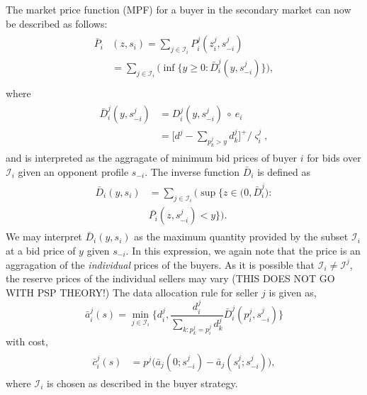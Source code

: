 \documentclass[12pt]{article}
\theoremstyle{definition}
\newcommand{\vs}{\varsigma}
\newcommand{\mcI}{\mathcal{I}}
\begin{document}
\begin{multicols}{2}
The market price function (MPF) for a buyer in the secondary market
can now be described as follows:
\begin{align}\label{dataprice}
\begin{split}
    \bar{P}_i&(z, s_i) =\displaystyle\sum_{j\in\mcI_i}P_i^j(z_i^j,
s_{-i}^j) \\
    &= \sum_{j\in\mcI_i}\bigg(\inf\bigg\lbrace y\ge 0 : 
    {\bar{D}_i^j}(y,s_{-i}^j)\bigg\rbrace \bigg),\\
\end{split}
\end{align}
where
\begin{align}
\begin{split}\label{datacomposed}
    \bar{D}_i^j(y,s_{-i}^j) &= D_i^j(y,s_{-i}^j)\ \circ\ e_i\\
    &= \bigg\lbrack d^j - \sum_{p_k^j> y} d_k^j\bigg\rbrack^+/\vs_i^j,
\end{split}
\end{align}
and is interpreted as the aggragate of minimum bid prices of buyer $i$ for bids
over $\mcI_i$ given an opponent profile $s_{-i}$.
The inverse function
$\bar{D}_i$ is defined as
\begin{align}\label{datapriceinverse}
\begin{split}
    \bar{D}_i(y, s_i) &= \displaystyle\sum_{j\in\mcI_i}\bigg(\sup\bigg\lbrace z\in \big( 0,
\bar{D}_i^j \big) : \\
    &\bar{P_i}(z,s_{-i}^j) < y\bigg\rbrace\bigg).
\end{split}
\end{align}
We may interpret $\bar{D}_i(y, s_i)$ as the maximum quantity provided by the subset
$\mcI_i$ at a bid price of $y$ given $s_{-i}$. In this expression, we again note that
the price is an aggragation of the \emph{individual} prices of the buyers. As it is
possible that $\mcI_i \ne \mcI^j$, the reserve prices of the individual sellers
may vary (THIS DOES NOT GO WITH PSP THEORY!)
The data allocation rule for seller $j$ is given as,
\begin{equation}\label{dataallocation}
    \bar{a}_i^j(s) = \min_{j\in\mcI_i}\bigg\lbrace d_i^j, \frac{d_i^j}{\sum_{k:p_k^j=
p_i^j}d_k^j}
\bar{D}_i^j(p_i^j,s_{-i}^j)\bigg\rbrace
\end{equation}
with cost,
\begin{align}\label{datacost}
\begin{split}
    \bar{c}_i^j(s) &= 
p^j \bigg(\bar{a}_j(0; s_{-i}^j)
    -\bar{a}_j(s_i^j;s_{-i}^j)\bigg) ,
\end{split}
\end{align}
where $\mcI_i$ is chosen as described in the buyer strategy.


\end{multicols}
\end{document}
